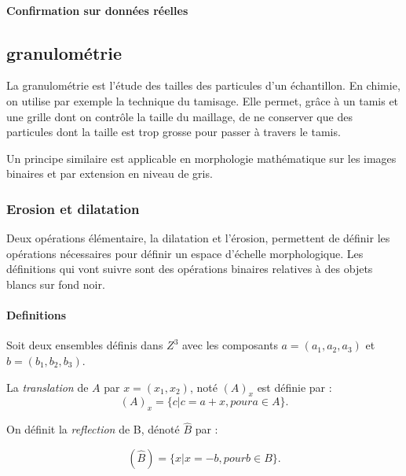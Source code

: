 \paragraph{Confirmation sur données réelles}


\subsection{granulométrie}
\label{sec:EA:rehaussement:echelle:granulometrie}

La granulométrie est l'étude des tailles des particules d'un échantillon. En chimie, on utilise par exemple la technique du tamisage. Elle permet, grâce à un tamis et une grille dont on contrôle la taille du maillage, de ne conserver que des particules dont la taille est trop grosse pour passer à travers le tamis.

Un principe similaire est applicable en morphologie mathématique sur les images binaires et par extension en niveau de gris.

\subsubsection{Erosion et dilatation }

Deux opérations élémentaire, la dilatation et l'érosion, permettent de définir les opérations nécessaires pour définir un espace d'échelle morphologique. Les définitions qui vont suivre sont des opérations binaires relatives à des objets blancs sur fond noir.

\paragraph{Definitions}
Soit deux ensembles définis dans $Z^3$ avec les composants $a=(a_1,a_2,a_3)$ et $b=(b_1,b_2,b_3)$.

La \emph{translation} de $A$ par $x = (x_1,x_2)$, noté $(A)_x$ est définie par :
\begin{equation}
  (A)_x = \{c|c = a+x, pour a \in A\}. 
\end{equation}

On définit la \emph{reflection} de B, dénoté $\widehat{B}$ par :

\begin{equation}
  (\widehat{B}) = \{x|x = -b, pour b \in B\}. 
\end{equation}

